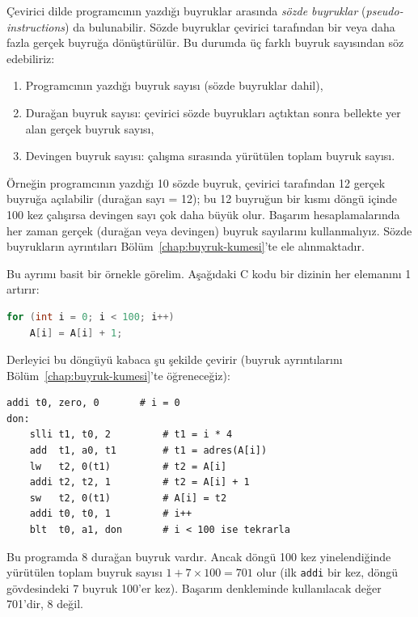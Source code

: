 \begin{bilginot}
Çevirici dilde programcının yazdığı buyruklar arasında \emph{sözde buyruklar} (\emph{pseudo-instructions}) da bulunabilir. Sözde buyruklar çevirici tarafından bir veya daha fazla gerçek buyruğa dönüştürülür. Bu durumda üç farklı buyruk sayısından söz edebiliriz:
\begin{enumerate}
\item Programcının yazdığı buyruk sayısı (sözde buyruklar dahil),
\item Durağan buyruk sayısı: çevirici sözde buyrukları açtıktan sonra bellekte yer alan gerçek buyruk sayısı,
\item Devingen buyruk sayısı: çalışma sırasında yürütülen toplam buyruk sayısı.
\end{enumerate}
Örneğin programcının yazdığı 10 sözde buyruk, çevirici tarafından 12 gerçek buyruğa açılabilir (durağan sayı = 12); bu 12 buyruğun bir kısmı döngü içinde 100 kez çalışırsa devingen sayı çok daha büyük olur. Başarım hesaplamalarında her zaman gerçek (durağan veya devingen) buyruk sayılarını kullanmalıyız. Sözde buyrukların ayrıntıları Bölüm~\ref{chap:buyruk-kumesi}'te ele alınmaktadır.
\end{bilginot}

Bu ayrımı basit bir örnekle görelim. Aşağıdaki C kodu bir dizinin her elemanını 1 artırır:

\begin{lstlisting}[language=C]
for (int i = 0; i < 100; i++)
    A[i] = A[i] + 1;
\end{lstlisting}

Derleyici bu döngüyü kabaca şu şekilde çevirir (buyruk ayrıntılarını Bölüm~\ref{chap:buyruk-kumesi}'te öğreneceğiz):

\begin{lstlisting}[style=riscv]
    addi t0, zero, 0       # i = 0
don:
    slli t1, t0, 2         # t1 = i * 4
    add  t1, a0, t1        # t1 = adres(A[i])
    lw   t2, 0(t1)         # t2 = A[i]
    addi t2, t2, 1         # t2 = A[i] + 1
    sw   t2, 0(t1)         # A[i] = t2
    addi t0, t0, 1         # i++
    blt  t0, a1, don       # i < 100 ise tekrarla
\end{lstlisting}

Bu programda 8 durağan buyruk vardır. Ancak döngü 100 kez yinelendiğinde yürütülen toplam buyruk sayısı $1 + 7 \times 100 = 701$ olur (ilk \texttt{addi} bir kez, döngü gövdesindeki 7 buyruk 100'er kez). Başarım denkleminde kullanılacak değer 701'dir, 8 değil.

